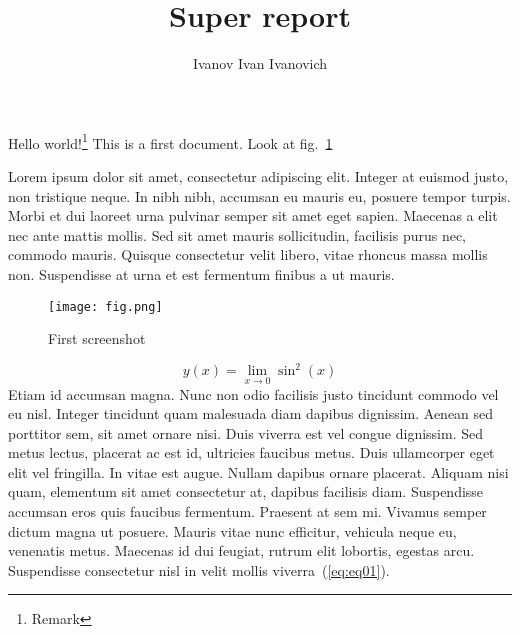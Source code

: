 \documentclass{article}
\author{Ivanov Ivan Ivanovich}
\title{Super report}
\begin{document}
  \maketitle
  \pagebreak


  Hello world!\footnote{Remark}
  This is a first document. Look at fig.~\ref{fig:fig01}

  Lorem ipsum dolor sit amet, consectetur adipiscing elit. Integer at euismod justo, non tristique neque. In nibh nibh, accumsan eu mauris eu, posuere tempor turpis. Morbi et dui laoreet urna pulvinar semper sit amet eget sapien. Maecenas a elit nec ante mattis mollis. Sed sit amet mauris sollicitudin, facilisis purus nec, commodo mauris. Quisque consectetur velit libero, vitae rhoncus massa mollis non. Suspendisse at urna et est fermentum finibus a ut mauris. 

  \begin{figure}[!h]
    \centering
    \texttt{[image: fig.png]}
    \caption{First screenshot}
    \label{fig:fig01}
  \end{figure}

  \begin{equation}\label{eq:eq01}
    y(x) = \lim_{x \to 0} \sin^2(x)
  \end{equation}
  Etiam id accumsan magna. Nunc non odio facilisis justo tincidunt commodo vel eu nisl. Integer tincidunt quam malesuada diam dapibus dignissim. Aenean sed porttitor sem, sit amet ornare nisi. Duis viverra est vel congue dignissim. Sed metus lectus, placerat ac est id, ultricies faucibus metus. Duis ullamcorper eget elit vel fringilla. In vitae est augue. Nullam dapibus ornare placerat. Aliquam nisi quam, elementum sit amet consectetur at, dapibus facilisis diam. Suspendisse accumsan eros quis faucibus fermentum. Praesent at sem mi. Vivamus semper dictum magna ut posuere. Mauris vitae nunc efficitur, vehicula neque eu, venenatis metus. Maecenas id dui feugiat, rutrum elit lobortis, egestas arcu. Suspendisse consectetur nisl in velit mollis viverra~(\ref{eq:eq01}).


  
\end{document}
